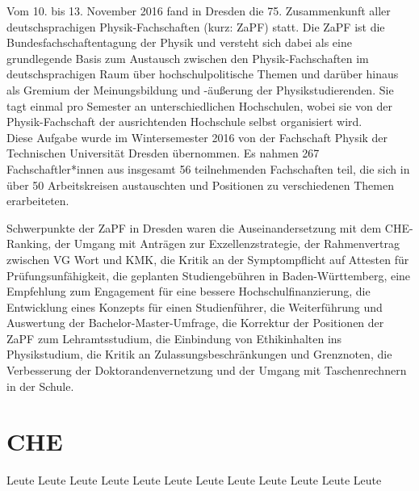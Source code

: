 Vom 10. bis 13. November 2016 fand in Dresden die 75. Zusammenkunft
aller deutschsprachigen Physik-Fachschaften (kurz: ZaPF) statt.  Die ZaPF ist
die Bundesfachschaftentagung der Physik und versteht sich dabei als eine
grundlegende Basis zum Austausch zwischen den Physik-Fachschaften im
deutschsprachigen Raum über hochschulpolitische Themen und darüber hinaus als
Gremium der Meinungsbildung und -äußerung der Physikstudierenden. Sie tagt
einmal pro Semester an unterschiedlichen Hochschulen, wobei sie von der
Physik-Fachschaft der ausrichtenden Hochschule selbst organisiert wird. \\

Diese Aufgabe wurde im Wintersemester 2016 von der Fachschaft Physik der Technischen Universität Dresden übernommen. 
Es nahmen 267 Fachschaftler*innen aus insgesamt 56 teilnehmenden Fachschaften teil, 
die sich in über 50 Arbeitskreisen austauschten und Positionen zu verschiedenen Themen erarbeiteten.

Schwerpunkte der ZaPF in Dresden waren die Auseinandersetzung mit dem CHE-Ranking, der Umgang mit Anträgen zur Exzellenzstrategie, der Rahmenvertrag zwischen VG Wort und KMK, 
die Kritik an der Symptompflicht auf Attesten für Prüfungsunfähigkeit, die geplanten Studiengebühren in Baden-Württemberg, 
eine Empfehlung zum Engagement für eine bessere Hochschulfinanzierung, die Entwicklung eines Konzepts für einen Studienführer, 
die Weiterführung und Auswertung der Bachelor-Master-Umfrage, die Korrektur der Positionen der ZaPF zum Lehramtsstudium, die Einbindung von Ethikinhalten ins Physikstudium, 
die Kritik an Zulassungsbeschränkungen und Grenznoten, die Verbesserung der Doktorandenvernetzung und der Umgang mit Taschenrechnern in der Schule.


\newpage

\section*{CHE}
Leute Leute Leute Leute Leute Leute Leute Leute Leute Leute Leute Leute 


